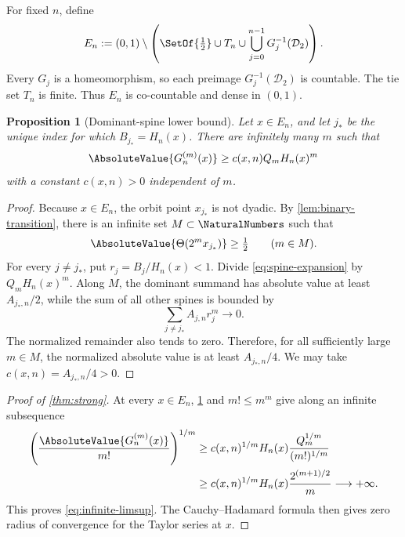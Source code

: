 \documentclass[11pt,oneside]{article}
\newtheorem{proposition}[theorem]{Proposition}
\theoremstyle{definition}
\theoremstyle{remark}
\newcommand{\D}{\mathcal{D}}
\newcommand{\ThetaF}{\Theta}
\newcommand{\half}{\tfrac12}
\begin{document}
For fixed $n$, define
\begin{equation}
 E_n:=(0,1)\setminus\left(
 \SetOf{\half}\cup T_n\cup
 \bigcup_{j=0}^{n-1}G_j^{-1}(\D_2)
 \right).
 \label{eq:En}
\end{equation}
Every $G_j$ is a homeomorphism, so each preimage $G_j^{-1}(\D_2)$ is countable.
The tie set $T_n$ is finite.  Thus $E_n$ is co-countable and dense in $(0,1)$.

\begin{proposition}[Dominant-spine lower bound]
\label{prop:dominant-lower-bound}
Let $x\in E_n$, and let $j_*$ be the unique index for which
$B_{j_*}=H_n(x)$.  There are infinitely many $m$ such that
\begin{equation}
 \AbsoluteValue{G_n^{(m)}(x)}
 \geq c(x,n)Q_mH_n(x)^m
 \label{eq:dominant-lower-bound}
\end{equation}
with a constant $c(x,n)>0$ independent of $m$.
\end{proposition}

\begin{proof}
Because $x\in E_n$, the orbit point $x_{j_*}$ is not dyadic.  By
\cref{lem:binary-transition}, there is an infinite set $M\subset\NaturalNumbers$ such that
\begin{equation}
 \AbsoluteValue{\ThetaF(2^m x_{j_*})}\geq\half
 \qquad(m\in M).
 \label{eq:dominant-theta}
\end{equation}
For every $j\neq j_*$, put $r_j=B_j/H_n(x)<1$.  Divide
\eqref{eq:spine-expansion} by $Q_mH_n(x)^m$.  Along $M$, the dominant summand has
absolute value at least $A_{j_*,n}/2$, while the sum of all other spines is bounded by
\[
 \sum_{j\neq j_*}A_{j,n}r_j^m\longrightarrow0.
\]
The normalized remainder also tends to zero.  Therefore, for all sufficiently large
$m\in M$, the normalized absolute value is at least $A_{j_*,n}/4$.  We may take
$c(x,n)=A_{j_*,n}/4>0$.
\end{proof}

\begin{proof}[Proof of \cref{thm:strong}]
At every $x\in E_n$, \cref{prop:dominant-lower-bound} and $m!\leq m^m$ give along an
infinite subsequence
\begin{align}
 \left(\frac{\AbsoluteValue{G_n^{(m)}(x)}}{m!}\right)^{1/m}
 &\geq c(x,n)^{1/m}H_n(x)
   \frac{Q_m^{1/m}}{(m!)^{1/m}}\\
 &\geq c(x,n)^{1/m}H_n(x)\frac{2^{(m+1)/2}}{m}
 \longrightarrow+\infty.
 \label{eq:root-divergence}
\end{align}
This proves \eqref{eq:infinite-limsup}.  The Cauchy--Hadamard formula then gives zero
radius of convergence for the Taylor series at $x$.
\end{proof}
\end{document}
